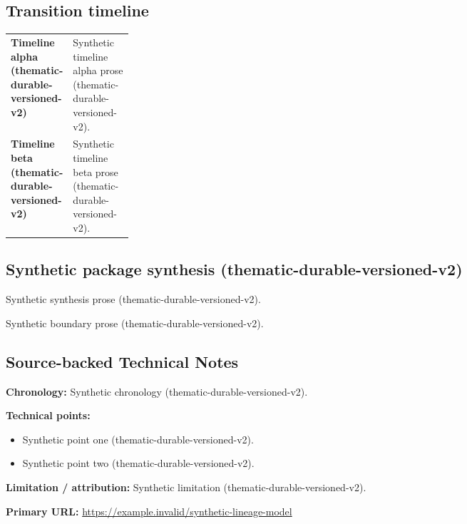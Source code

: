 \documentclass[lualatex,a4paper,10pt]{jlreq}
\begin{document}
\medskip
\begin{wideflow}
\subsection*{Transition timeline}
\begin{tabularx}{\linewidth}{@{}>{\bfseries}p{0.20\linewidth}X@{}}
Timeline alpha (thematic-durable-versioned-v2) & Synthetic timeline alpha prose (thematic-durable-versioned-v2). \cite{sp001lnd001} \\
Timeline beta (thematic-durable-versioned-v2) & Synthetic timeline beta prose (thematic-durable-versioned-v2). \cite{sp001lnd001} \\
\end{tabularx}
\end{wideflow}
\medskip
\begin{multicols}{2}
\subsection*{Synthetic package synthesis (thematic-durable-versioned-v2)}
\noindent Synthetic synthesis prose (thematic-durable-versioned-v2). \cite{sp001lnd001}\par\medskip
\end{multicols}
\medskip
\begin{claimboundary}
\noindent Synthetic boundary prose (thematic-durable-versioned-v2). \cite{sp001lnd001}\par
\end{claimboundary}
\medskip
\subsection*{Source-backed Technical Notes}
\begin{technicalnote}
\noindent\textbf{Chronology:} Synthetic chronology (thematic-durable-versioned-v2). \cite{sp001lnd001}\par
\smallskip\noindent\textbf{Technical points:}\par
\begin{itemize}
\item Synthetic point one (thematic-durable-versioned-v2). \cite{sp001lnd001}
\item Synthetic point two (thematic-durable-versioned-v2). \cite{sp001lnd001}
\end{itemize}
\noindent\textbf{Limitation / attribution:} Synthetic limitation (thematic-durable-versioned-v2).\par
\smallskip\noindent\textbf{Primary URL:} \url{https://example.invalid/synthetic-lineage-model}\par
\end{technicalnote}
\smallskip
\Needspace{0.30\textheight}
\end{document}

